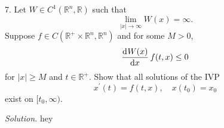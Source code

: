 \documentclass{article}
\newcommand{\R}{\mathbb{R}}
\begin{document}
\newpage

7. Let $W \in C^1(\R^n, \R)$ such that
%
\begin{equation*}
    \lim_{|x| \to \infty} W(x) = \infty
    .
\end{equation*}
%
Suppose $f \in C(\R^+ \times \R^n, \R^n)$ and for some $M > 0$,
%
\begin{equation*}
    \dod{W(x)}{x} f(t, x) \leq 0
\end{equation*}
%
for $|x| \geq M$ and $t \in \R^+$. Show that all solutions of the IVP
%
\begin{equation*}
    x^\prime(t) = f(t, x), \quad x(t_0) = x_0
\end{equation*}
%
exist on $[t_0, \infty)$.

\textit{Solution.}
hey
\end{document}
